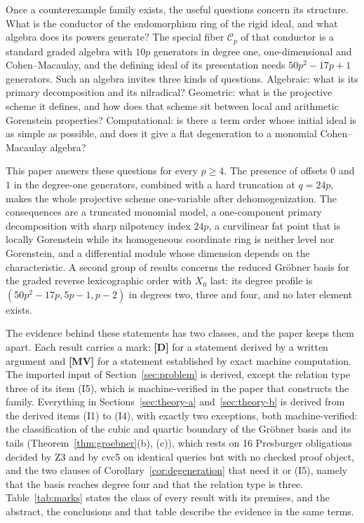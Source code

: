 \documentclass[11pt]{article}
\theoremstyle{definition}
\theoremstyle{remark}
\newcommand{\Cfiber}{\mathcal{C}}
\newcommand{\mD}{\textbf{[D]}}
\newcommand{\mMV}{\textbf{[MV]}}
\begin{document}
Once a counterexample family exists, the useful questions concern its structure. What is the
conductor of the endomorphism ring of the rigid ideal, and what algebra does its powers generate?
The special fiber $\Cfiber_p$ of that conductor is a standard graded algebra with $10p$
generators in degree one, one-dimensional and Cohen--Macaulay, and the defining ideal of its
presentation needs $50p^2-17p+1$ generators. Such an algebra invites three kinds of questions.
Algebraic: what is its primary decomposition and its nilradical? Geometric: what is the
projective scheme it defines, and how does that scheme sit between local and arithmetic
Gorenstein properties? Computational: is there a term order whose initial ideal is as simple as
possible, and does it give a flat degeneration to a monomial Cohen--Macaulay algebra?

This paper answers these questions for every $p\geq4$. The presence of offsets $0$ and $1$ in
the degree-one generators, combined with a hard truncation at $q=24p$, makes the whole
projective scheme one-variable after dehomogenization. The consequences are a truncated monomial
model, a one-component primary decomposition with sharp nilpotency index $24p$, a curvilinear
fat point that is locally Gorenstein while its homogeneous coordinate ring is neither level nor
Gorenstein, and a differential module whose dimension depends on the characteristic. A second
group of results concerns the reduced Gr\"obner basis for the graded reverse lexicographic order
with $X_0$ last: its degree profile is $(50p^2-17p,5p-1,p-2)$ in degrees two, three and four,
and no later element exists.

The evidence behind these statements has two classes, and the paper keeps them apart. Each
result carries a mark: \mD{} for a statement derived by a written argument and \mMV{} for a
statement established by exact machine computation. The imported input of
Section~\ref{sec:problem} is derived, except the relation type three of its item (I5), which is
machine-verified in the paper that constructs the family. Everything in Sections~\ref{sec:theory-a}
and~\ref{sec:theory-b} is derived from the derived items (I1) to (I4), with exactly two exceptions,
both machine-verified: the classification of the cubic and quartic boundary of the Gr\"obner basis
and its tails (Theorem~\ref{thm:groebner}(b), (c)), which rests on 16 Presburger obligations decided
by Z3 and by cvc5 on identical queries but with no checked proof object, and the two clauses of
Corollary~\ref{cor:degeneration} that need it or (I5), namely that the basis reaches degree four
and that the relation type is three. Table~\ref{tab:marks} states the class of every result with
its premises, and the abstract, the conclusions and that table describe the evidence in the same
terms.
\end{document}
